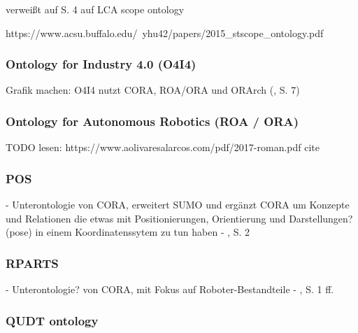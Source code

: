 \documentclass{article}
\begin{document}
\cite{vardem2015anminimal} verweißt auf S. 4 auf LCA scope ontology

https://www.acsu.buffalo.edu/~yhu42/papers/2015\_stscope\_ontology.pdf

\subsubsection{Ontology for Industry 4.0 (O4I4)}

\cite{kumar2019ontologies}

Grafik machen: O4I4 nutzt CORA, ROA/ORA und ORArch (\cite{kumar2019ontologies}, S. 7)

\subsubsection{Ontology for Autonomous Robotics (ROA / ORA)}
TODO lesen: https://www.aolivaresalarcos.com/pdf/2017-roman.pdf
cite \cite{olszewska2017ontology}

\subsubsection{POS}

- Unterontologie von CORA, erweitert SUMO und ergänzt CORA um Konzepte und Relationen die etwas mit Positionierungen, Orientierung und Darstellungen? (pose) in einem Koordinatenssytem zu tun haben - \cite{prestes2014core}, S. 2

\subsubsection{RPARTS}

- Unterontologie? von CORA, mit Fokus auf Roboter-Bestandteile - \cite{prestes2014core}, S. 1 ff.

\subsubsection{QUDT ontology}




\medskip

\printbibliography
\end{document}
